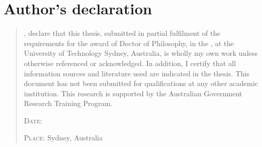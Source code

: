 \chapter*{Author's declaration}
\begin{SingleSpace}
\begin{quote}
,  
\emph{\utsname} declare that this thesis, submitted in partial fulfilment of the requirements for
the award of Doctor of Philosophy, 
in the \emph{\utsschool}, 
\emph{\utsfaculty}
at the University of Technology Sydney, Australia, is wholly my own work unless otherwise referenced or acknowledged. 
In addition, I certify that all information sources and literature used are indicated in the thesis.
This document has not been submitted for qualifications at any other academic institution.
%
This research is supported by the Australian Government Research Training Program.

\noindent

\noindent
{}


\vspace{0.35cm}
\noindent 
\hspace{-0.75cm}\textsc{Date: } \DTMdate{\utsyear-\utsmonth-\utsday}

\noindent 
\hspace{-0.75cm}\textsc{Place: } Sydney, Australia

\end{quote}
\end{SingleSpace}
\clearpage